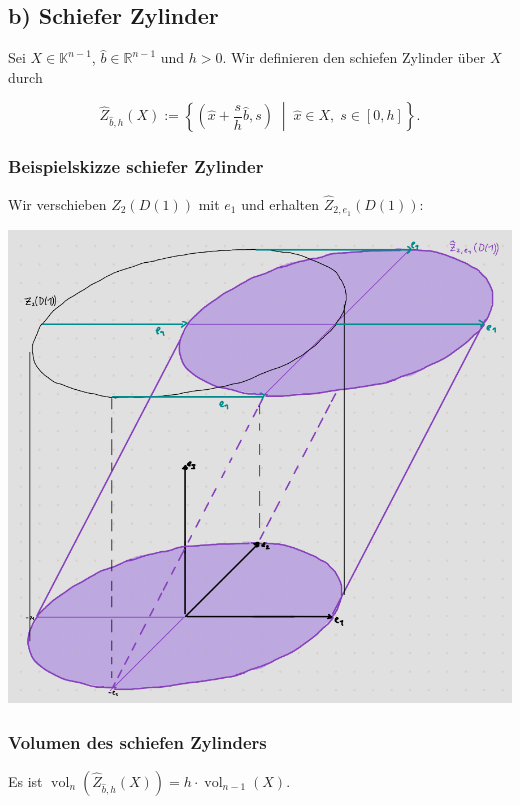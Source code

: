 \documentclass{article}
\begin{document}
\newpage
\subsection*{b) Schiefer Zylinder}

Sei \( X \in \mathbb{K}^{n-1} \), \( \hat{b} \in \mathbb{R}^{n-1} \) und \( h > 0 \). Wir definieren den schiefen Zylinder über \( X \) durch

\[
\hat{Z}_{\hat{b},h}(X) := \left\{ 
\left( \hat{x} + \frac{s}{h} \hat{b}, s \right) \; \middle| \; \hat{x} \in X, \; s \in [0, h] 
\right\}.
\]

\subsubsection*{Beispielskizze schiefer Zylinder}
Wir verschieben $Z_2(D(1))$ mit $e_1$ und erhalten $\hat{Z}_{2,e_1}(D(1))$:
\begin{center}
  \includegraphics[width=1\textwidth]{skizze.png}
\end{center}


\newpage

\subsubsection*{Volumen des schiefen Zylinders}

Es ist $\operatorname{vol}_n \left( \hat{Z}_{\hat{b}, h}(X) \right) = h \cdot \operatorname{vol}_{n-1}(X)$.
\end{document}
